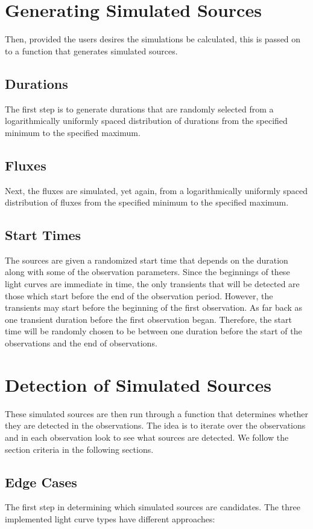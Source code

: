 \documentclass{article}
\begin{document}
 \section{Generating Simulated Sources}
 Then, provided the users desires the simulations be calculated, this is passed on to a function that generates simulated sources. 
 \subsection{Durations}
 The first step is to generate durations that are randomly selected from a logarithmically uniformly spaced distribution of durations from the specified minimum to the specified maximum.
 \subsection{Fluxes}
 Next, the fluxes are simulated, yet again, from a logarithmically uniformly spaced distribution of fluxes from the specified minimum to the specified maximum.
 \subsection{Start Times}
 The sources are given a randomized start time that depends on the duration along with some of the observation parameters. Since the beginnings of these light curves are immediate in time, the only transients that will be detected are those which start before the end of the observation period. However, the transients may start before the beginning of the first observation. As far back as one transient duration before the first observation began. Therefore, the start time will be randomly chosen to be between one duration before the start of the observations and the end of observations.
\section{Detection of Simulated Sources}
These simulated sources are then run through a function that determines whether they are detected in the observations. The idea is to iterate over the observations and in each observation look to see what sources are detected. We follow the section criteria in the following sections.
\subsection{Edge Cases}
The first step in determining which simulated sources are candidates. The three implemented light curve types have different approaches:
\end{document}
